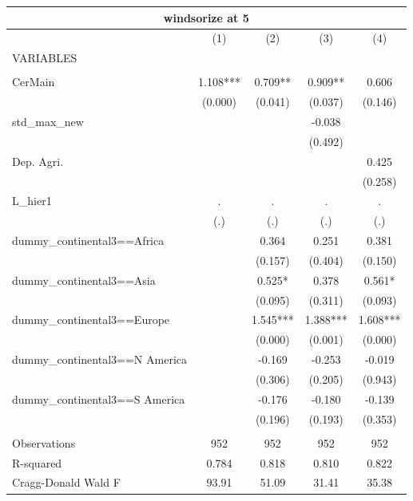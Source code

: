 \documentclass[12pt,a4paper]{article}
\begin{document}
\begin{tabular}{lcccc}
\multicolumn{5}{c}{windsorize at 5} \\ \hline
 & (1) & (2) & (3) & (4) \\
VARIABLES &  &  &  &  \\ \hline
 &  &  &  &  \\
CerMain & 1.108*** & 0.709** & 0.909** & 0.606 \\
 & (0.000) & (0.041) & (0.037) & (0.146) \\
std\_max\_new &  &  & -0.038 &  \\
 &  &  & (0.492) &  \\
Dep. Agri. &  &  &  & 0.425 \\
 &  &  &  & (0.258) \\
L\_hier1 & . & . & . & . \\
 & (.) & (.) & (.) & (.) \\
dummy\_continental3==Africa &  & 0.364 & 0.251 & 0.381 \\
 &  & (0.157) & (0.404) & (0.150) \\
dummy\_continental3==Asia &  & 0.525* & 0.378 & 0.561* \\
 &  & (0.095) & (0.311) & (0.093) \\
dummy\_continental3==Europe &  & 1.545*** & 1.388*** & 1.608*** \\
 &  & (0.000) & (0.001) & (0.000) \\
dummy\_continental3==N America &  & -0.169 & -0.253 & -0.019 \\
 &  & (0.306) & (0.205) & (0.943) \\
dummy\_continental3==S America &  & -0.176 & -0.180 & -0.139 \\
 &  & (0.196) & (0.193) & (0.353) \\
 &  &  &  &  \\
Observations & 952 & 952 & 952 & 952 \\
R-squared & 0.784 & 0.818 & 0.810 & 0.822 \\
 Cragg-Donald Wald F & 93.91 & 51.09 & 31.41 & 35.38 \\ \hline
\end{tabular}
\end{document}
